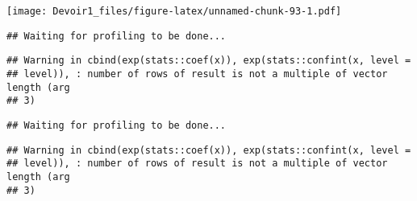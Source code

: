 \documentclass[]{article}
\newenvironment{Shaded}{\begin{snugshade}}{\end{snugshade}}
\newcommand{\KeywordTok}[1]{\textcolor[rgb]{0.13,0.29,0.53}{\textbf{#1}}}
\newcommand{\DataTypeTok}[1]{\textcolor[rgb]{0.13,0.29,0.53}{#1}}
\newcommand{\DecValTok}[1]{\textcolor[rgb]{0.00,0.00,0.81}{#1}}
\newcommand{\StringTok}[1]{\textcolor[rgb]{0.31,0.60,0.02}{#1}}
\newcommand{\OperatorTok}[1]{\textcolor[rgb]{0.81,0.36,0.00}{\textbf{#1}}}
\newcommand{\NormalTok}[1]{#1}
\begin{document}
\texttt{[image: Devoir1\_files/figure-latex/unnamed-chunk-93-1.pdf]}

\begin{Shaded}
\end{Shaded}

\begin{verbatim}
## Waiting for profiling to be done...
\end{verbatim}

\begin{verbatim}
## Warning in cbind(exp(stats::coef(x)), exp(stats::confint(x, level =
## level)), : number of rows of result is not a multiple of vector length (arg
## 3)
\end{verbatim}

\begin{verbatim}
## Waiting for profiling to be done...
\end{verbatim}

\begin{verbatim}
## Warning in cbind(exp(stats::coef(x)), exp(stats::confint(x, level =
## level)), : number of rows of result is not a multiple of vector length (arg
## 3)
\end{verbatim}
\end{document}

